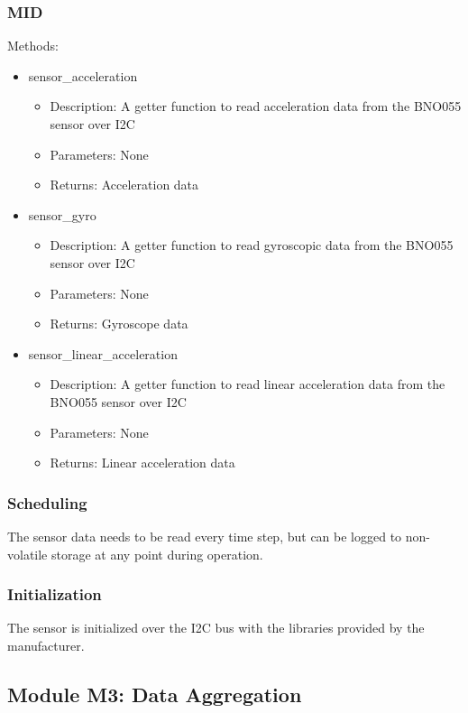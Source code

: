 \documentclass[11pt]{article}
\begin{document}
			\subsubsection{MID}
				Methods:
				\begin{itemize}
					\item sensor\_acceleration
						\begin{itemize}
							\item Description: A getter function to read acceleration data from the BNO055 sensor over I2C 
							\item Parameters: None 
							\item Returns: Acceleration data
						\end{itemize}
					\item sensor\_gyro
						\begin{itemize}
							\item Description: A getter function to read gyroscopic data from the BNO055 sensor over I2C 
							\item Parameters: None 
							\item Returns: Gyroscope data
						\end{itemize}
					\item sensor\_linear\_acceleration
						\begin{itemize}
							\item Description: A getter function to read linear acceleration data from the BNO055 sensor over I2C 
							\item Parameters: None 
							\item Returns: Linear acceleration data
						\end{itemize}
				\end{itemize}
			\subsubsection{Scheduling}
				The sensor data needs to be read every time step, but can be logged to non-volatile storage at any point during operation. 
			\subsubsection{Initialization}
				The sensor is initialized over the I2C bus with the libraries provided by the manufacturer.  

		\subsection{Module M3: Data Aggregation}
		\label{sec:M3}
\end{document}
